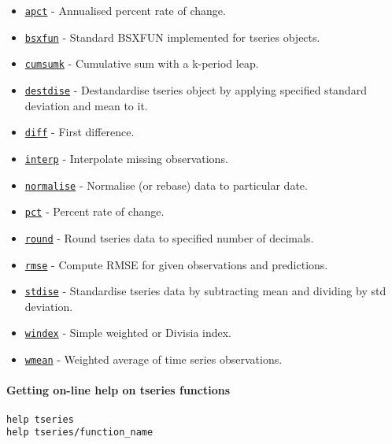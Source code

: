 \begin{itemize}
\itemsep1pt\parskip0pt
\item
  \href{tseries/apct}{\texttt{apct}} - Annualised percent rate of
  change.
\item
  \href{tseries/bsxfun}{\texttt{bsxfun}} - Standard BSXFUN implemented
  for tseries objects.
\item
  \href{tseries/cumsumk}{\texttt{cumsumk}} - Cumulative sum with a
  k-period leap.
\item
  \href{tseries/destdise}{\texttt{destdise}} - Destandardise tseries
  object by applying specified standard deviation and mean to it.
\item
  \href{tseries/diff}{\texttt{diff}} - First difference.
\item
  \href{tseries/interp}{\texttt{interp}} - Interpolate missing
  observations.
\item
  \href{tseries/normalise}{\texttt{normalise}} - Normalise (or rebase)
  data to particular date.
\item
  \href{tseries/pct}{\texttt{pct}} - Percent rate of change.
\item
  \href{tseries/round}{\texttt{round}} - Round tseries data to specified
  number of decimals.
\item
  \href{tseries/rmse}{\texttt{rmse}} - Compute RMSE for given
  observations and predictions.
\item
  \href{tseries/stdise}{\texttt{stdise}} - Standardise tseries data by
  subtracting mean and dividing by std deviation.
\item
  \href{tseries/windex}{\texttt{windex}} - Simple weighted or Divisia
  index.
\item
  \href{tseries/wmean}{\texttt{wmean}} - Weighted average of time series
  observations.
\end{itemize}

\paragraph{Getting on-line help on tseries
functions}\label{getting-on-line-help-on-tseries-functions}

\begin{verbatim}
help tseries
help tseries/function_name
\end{verbatim}



